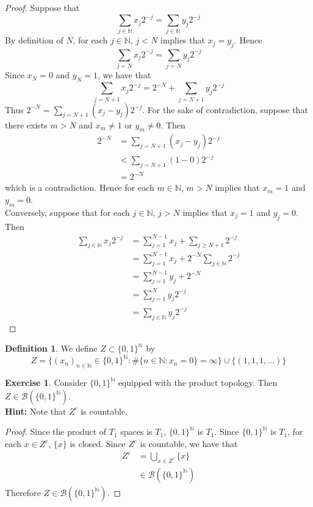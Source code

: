 \documentclass[12pt]{amsart}
\theoremstyle{definition}
\newtheorem{defn}[definition]{Definition}
\newtheorem{ex}[definition]{Exercise}
\newcommand{\N}{\mathbb{N}}
\newcommand{\MB}{\mathcal{B}}
\newcommand{\lex}[1]{\label{ex:#1}}
\begin{document}
	\begin{proof}
		Suppose that 
		$$\sum\limits_{j \in \N} x_j 2^{-j} = \sum\limits_{j \in \N} y_j 2^{-j}$$
		By definition of $N$, for each $j \in \N$, $j < N$ implies that $x_j = y_j$. Hence 
		$$\sum\limits_{j = N} x_j 2^{-j} = \sum\limits_{j = N} y_j 2^{-j}$$ 
		Since $x_N = 0$ and $y_N = 1$, we have that 
		$$\sum\limits_{j = N +1} x_j 2^{-j} = 2^{-N} + \sum\limits_{j = N+1} y_j 2^{-j}$$ 
		Thus $2^{-N} = \sum\limits_{j = N+1} (x_j - y_j) 2^{-j}$. For the sake of contradiction, suppose that there exists $m > N$ and $x_m \neq 1$ or $y_m \neq 0$. Then
		\begin{align*}
			2^{-N} 
			&= \sum\limits_{j = N+1} (x_j - y_j) 2^{-j} \\
			& < \sum\limits_{j = N+1} (1 - 0) 2^{-j} \\
			& = 2^{-N}
		\end{align*}
		which is a contradiction. Hence for each $m \in \N$, $m > N$ implies that $x_m = 1$ and $y_m = 0$. \vspace{.2cm}\\
		Conversely, suppose that for each $j \in \N$, $j > N$ implies that $x_j = 1$ and $y_j = 0$. Then 
		\begin{align*}
			\sum\limits_{j \in \N} x_j 2^{-j}
			& = \sum_{j=1}^{N-1} x_j + \sum_{j \geq N+1} 2^{-j} \\
			& = \sum_{j=1}^{N-1} x_j + 2^{-N} \sum_{j \in \N} 2^{-j} \\
			& = \sum_{j=1}^{N-1} y_j + 2^{-N} \\
			& = \sum_{j=1}^N y_j2^{-j} \\
			& = \sum\limits_{j \in \N} y_j 2^{-j}
		\end{align*}
	\end{proof}

	\begin{defn} \lex{28003} 
		We define $Z \subset \{0,1\}^{\N}$ by 
		$$Z = \bigg \{(x_n)_{n \in \N} \in \{0,1\}^{\N}: \# \{n \in \N: x_n = 0\} = \infty  \bigg \} \cup \{(1, 1, 1, \ldots)\}$$ 
	\end{defn}

	\begin{ex}
		Consider $\{0, 1\}^{\N}$ equipped with the product topology. Then $Z \in \MB(\{0,1\}^{\N})$. \\
		\textbf{Hint:} Note that $Z^c$ is countable. 
	\end{ex}

	\begin{proof}
		Since the product of $T_1$ spaces is $T_1$, $\{0,1\}^{\N}$ is $T_1$. Since $\{0,1\}^{\N}$ is $T_1$, for each $x \in Z^c$, $\{x \}$ is closed. Since $Z^c$ is countable, we have that 
		\begin{align*}
			Z^c
			& = \bigcup_{x \in  Z^c} \{x\} \\
			& \in  \MB(\{0,1\}^{\N})
		\end{align*} 
		Therefore $Z \in  \MB(\{0,1\}^{\N})$.
	\end{proof}
\end{document}
